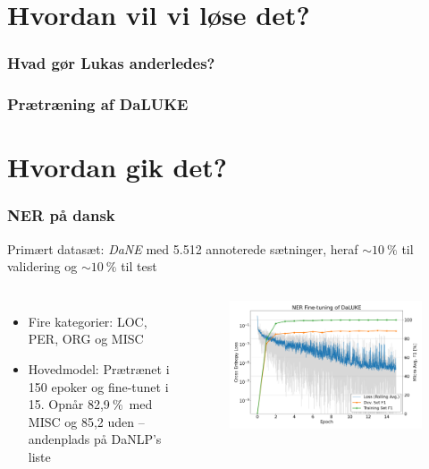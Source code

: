 \documentclass{beamer}
\newcommand{\unit}[1]{\ensuremath{\:\text{#1}}}
\newcommand{\pro}{\ensuremath{\unit{\%{}}}}
\begin{document}
\section{Hvordan vil vi løse det?}
\begin{frame}
    \frametitle{Hvad gør Lukas anderledes?}
\end{frame}

\begin{frame}
    \frametitle{Prætræning af DaLUKE}
\end{frame}

\section{Hvordan gik det?}
\begin{frame}
    \frametitle{NER på dansk}
    Primært datasæt: \emph{DaNE} med 5.512 annoterede sætninger, heraf $ \sim 10\pro $ til validering og $ \sim 10\pro $ til test
    \begin{columns}
        \begin{itemize}
            \item Fire kategorier: LOC, PER, ORG og MISC
            \item Hovedmodel: Prætrænet i 150 epoker og fine-tunet i 15.
            Opnår 82,9\pro\ med MISC og 85,2 uden -- andenplads på DaNLP's liste
        \end{itemize}
        \begin{figure}[H]
            \centering
            \includegraphics[width=\textwidth]{loss-fine}
        \end{figure}
    \end{columns}
\end{frame}
\end{document}
